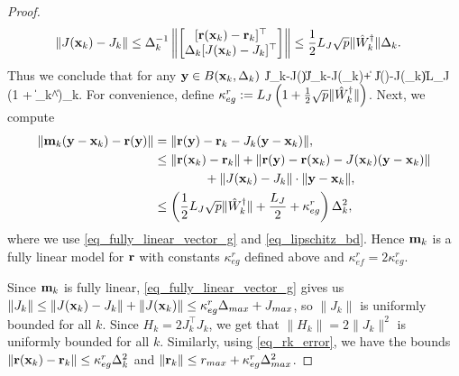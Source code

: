 \begin{proof}
\begin{align}
	\|J(\mathbf{x}_k)-J_k\| &\leq \Delta_k^{-1} \left\|\begin{bmatrix}[\mathbf{r}(\mathbf{x}_k)-\mathbf{r}_k]^{\top} \\ \Delta_k [J(\mathbf{x}_k)-J_k]^{\top}\end{bmatrix}\right\| \leq \frac{1}{2}L_J\sqrt{p}\|\hat{W}_k^{\dagger}\|\Delta_k.
\end{align}
Thus we conclude that for any $\mathbf{y}\in B(\mathbf{x}_k,\Delta_k)$
\be \|J_k-J(\by)\| \leq \|J_k-J(\bx_k)\| + \|J(\by)-J(\bx_k)\| \leq L_J \left(1 + \|_k^{\dagger}\|\right)\Delta_k.  \label{eq_fully_linear_vector_g} \ee
For convenience, define $\kappa_{eg}^r := L_J \left(1 + \frac{1}{2}\sqrt{p}\|\hat{W}_k^{\dagger}\|\right)$.
Next, we compute
\begin{align}
	\|\mathbf{m}_k(\mathbf{y}-\mathbf{x}_k) - \mathbf{r}(\mathbf{y})\| &= \|\mathbf{r}(\mathbf{y}) - \mathbf{r}_k - J_k(\mathbf{y}-\mathbf{x}_k)\|, \\
	&\leq \|\mathbf{r}(\mathbf{x}_k)-\mathbf{r}_k\| + \|\mathbf{r}(\mathbf{y}) - \mathbf{r}(\mathbf{x}_k) - J(\mathbf{x}_k)(\mathbf{y}-\mathbf{x}_k)\| \nonumber \\
	&\qquad\qquad + \|J(\mathbf{x}_k)-J_k\|\cdot\|\mathbf{y}-\mathbf{x}_k\|, \\
	&\leq \left(\frac{1}{2}L_J\sqrt{p}\|\hat{W}_k^{\dagger}\| + \frac{L_J}{2} + \kappa_{eg}^r\right)\Delta_k^2,
\end{align}
where we use \eqref{eq_fully_linear_vector_g} and \eqref{eq_lipschitz_bd}.
Hence $\mathbf{m}_k$ is a fully linear model for $\mathbf{r}$ with constants $\kappa_{eg}^r$ defined above and $\kappa_{ef}^r = 2\kappa_{eg}^r$.

Since $\mathbf{m}_k$ is fully linear, \eqref{eq_fully_linear_vector_g} gives us
$\|J_k\| \leq \|J(\mathbf{x}_k) - J_k\| + \|J(\mathbf{x}_k)\| \leq \kappa_{eg}^r\Delta_{max} + J_{max}$, 
so $\|J_k\|$ is uniformly bounded for all $k$. Since $H_k = 2 J_k^{\top}J_k$, we get that $\|H_k\| = 2 \|J_k\|^2$ is uniformly bounded for all $k$. 
Similarly, using \eqref{eq_rk_error}, we have the bounds $\|\mathbf{r}(\mathbf{x}_k)-\mathbf{r}_k\| \leq \kappa_{eg}^r\Delta_k^2$ and $\|\mathbf{r}_k\| \leq r_{max}+\kappa_{eg}^r\Delta_{max}^2$.


\end{proof}
